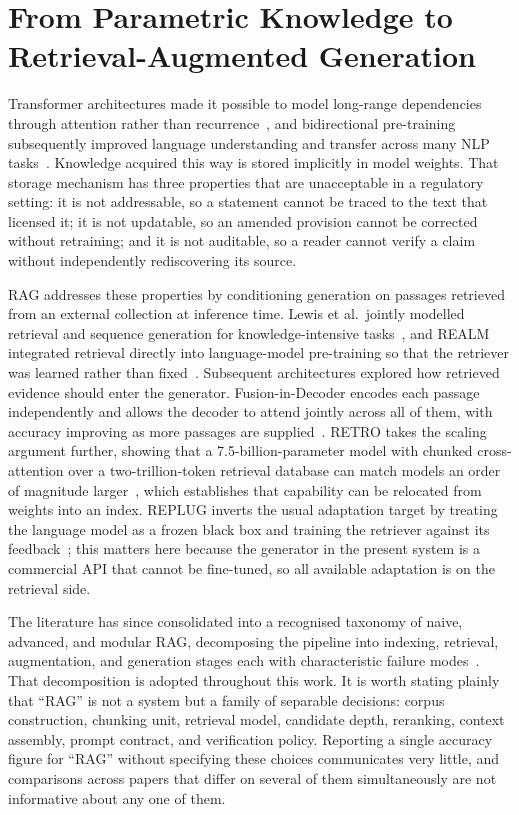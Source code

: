 \section{From Parametric Knowledge to Retrieval-Augmented Generation}
\label{sec:sota-rag}

Transformer architectures made it possible to model long-range dependencies through attention rather than recurrence~\cite{vaswani2017attention}, and bidirectional pre-training subsequently improved language understanding and transfer across many \ac{NLP} tasks~\cite{devlin2019bert}. Knowledge acquired this way is stored implicitly in model weights. That storage mechanism has three properties that are unacceptable in a regulatory setting: it is not addressable, so a statement cannot be traced to the text that licensed it; it is not updatable, so an amended provision cannot be corrected without retraining; and it is not auditable, so a reader cannot verify a claim without independently rediscovering its source.

\ac{RAG} addresses these properties by conditioning generation on passages retrieved from an external collection at inference time. Lewis et al.\ jointly modelled retrieval and sequence generation for knowledge-intensive tasks~\cite{lewis2020rag}, and REALM integrated retrieval directly into language-model pre-training so that the retriever was learned rather than fixed~\cite{guu2020realm}. Subsequent architectures explored how retrieved evidence should enter the generator. Fusion-in-Decoder encodes each passage independently and allows the decoder to attend jointly across all of them, with accuracy improving as more passages are supplied~\cite{izacard2021fid}. RETRO takes the scaling argument further, showing that a 7.5-billion-parameter model with chunked cross-attention over a two-trillion-token retrieval database can match models an order of magnitude larger~\cite{borgeaud2022retro}, which establishes that capability can be relocated from weights into an index. REPLUG inverts the usual adaptation target by treating the language model as a frozen black box and training the retriever against its feedback~\cite{shi2024replug}; this matters here because the generator in the present system is a commercial \ac{API} that cannot be fine-tuned, so all available adaptation is on the retrieval side.

The literature has since consolidated into a recognised taxonomy of naive, advanced, and modular \ac{RAG}, decomposing the pipeline into indexing, retrieval, augmentation, and generation stages each with characteristic failure modes~\cite{gao2023ragsurvey}. That decomposition is adopted throughout this work. It is worth stating plainly that ``\ac{RAG}'' is not a system but a family of separable decisions: corpus construction, chunking unit, retrieval model, candidate depth, reranking, context assembly, prompt contract, and verification policy. Reporting a single accuracy figure for ``\ac{RAG}'' without specifying these choices communicates very little, and comparisons across papers that differ on several of them simultaneously are not informative about any one of them.

